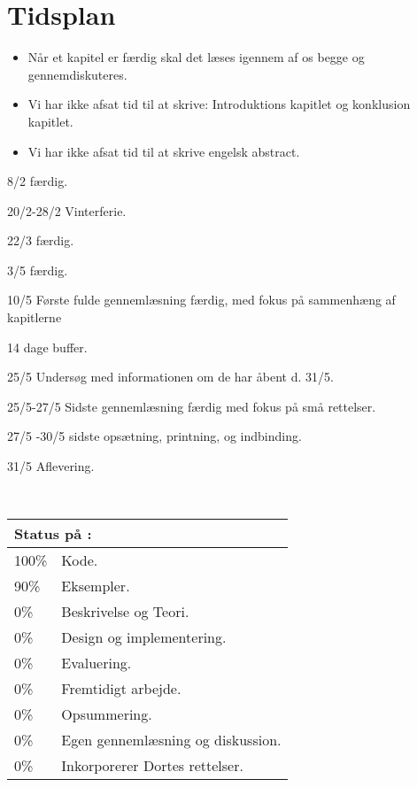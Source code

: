 \chapter{Tidsplan}

\begin{itemize}\tightlist
\item Når et kapitel er færdig skal det læses igennem af os begge og gennemdiskuteres.
\item Vi har ikke afsat tid til at skrive: Introduktions kapitlet og konklusion kapitlet.
\item Vi har ikke afsat tid til at skrive engelsk abstract.
\end{itemize}

\begin{list}{}{}
\tightlist 
\item [8/2] \des færdig.
\item [20/2-28/2] Vinterferie.
\item [22/3] \ds færdig.
\item [3/5] \is færdig.
\item [10/5] Første fulde gennemlæsning færdig, med fokus på sammenhæng af kapitlerne
\item [14 dage buffer.]
\item[25/5] Undersøg med informationen om de har åbent d. 31/5.
\item [25/5-27/5] Sidste gennemlæsning færdig med fokus på små rettelser.
\item [27/5 -30/5] sidste opsætning, printning, og indbinding.
\item [31/5] Aflevering. 
\end{list}\
\begin{tabular}{m{0.5cm}m{5cm}}
\hline  
\multicolumn{2}{m{4.5cm}}{\textbf{Status på \des:}} \\
\hline
100\% & Kode.  \\ 
90\% & Eksempler.\\
0\% & Beskrivelse og Teori.\\
0\% & Design og  implementering. \\
0\% & Evaluering. \\
0\% & Fremtidigt arbejde. \\
0\% & Opsummering. \\ 
0\% & Egen gennemlæsning og diskussion. \\ 
0\% & Inkorporerer Dortes rettelser. \\ 
\hline
\end{tabular}
\quad
